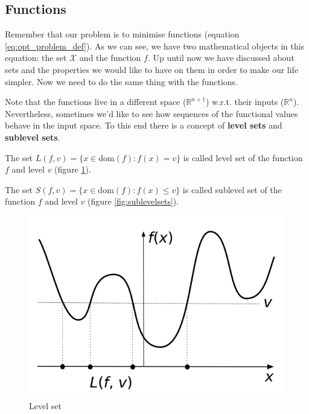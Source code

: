 \subsection{Functions}
\par Remember that our problem is to minimise functions (equation \ref{eq:opt_problem_def}). As we can see, we have two mathematical objects in this equation: the set $\mathcal{X}$ and the function $f$. Up until now we have discussed about sets and the properties we would like to have on them in order to make our life simpler. Now we need to do the same thing with the functions.
\par Note that the functions live in a different space ($\mathbb{R}^{n+1}$) w.r.t. their inputs ($\mathbb{R}^n$). Nevertheless, sometimes we'd like to see how sequences of the functional values behave in the input space. To this end there is a concept of \textbf{level sets} and \textbf{sublevel sets}.
\begin{definition}
    The set $L(f,v) = \{x \in \text{dom}(f) : f(x) = v\}$ is called level set of the function $f$ and level $v$ (figure \ref{fig:levelsets}).
\end{definition}
\begin{definition}
    The set $S(f,v) = \{x \in \text{dom}(f) : f(x) \leq v\}$ is called sublevel set of the function $f$ and level $v$ (figure \ref{fig:sublevelsets}).
\end{definition}
\begin{figure}
    \centering
    \includegraphics[scale=0.4]{figures/1/3-levelsets.png}
    \caption{Level set}
    \label{fig:levelsets}
\end{figure}
